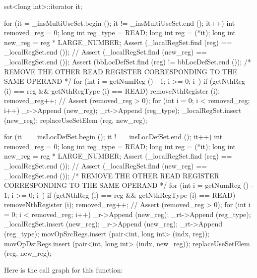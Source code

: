 \begin{DoxyCode}
                                                                                 
                                                                         {
    set<long int>::iterator it;

    for (it = _insMultiUseSet.begin (); it != _insMultiUseSet.end (); it++) {
        int removed_reg = 0;
        long int reg_type = READ;
        long int reg = (*it);
        long int new_reg = reg * LARGE_NUMBER;
        Assert (_localRegSet.find (reg) == _localRegSet.end ());
//        Assert (_localRegSet.find (new_reg) == _localRegSet.end ());
        Assert (bbLocDefSet.find (reg) != bbLocDefSet.end ());
        /* REMOVE THE OTHER READ REGISTER CORRESPONDING TO THE SAME OPERAND */
        for (int i = getNumReg () - 1; i >= 0; i--) {
            if (getNthReg (i) == reg && getNthRegType (i) == READ) {
                removeNthRegister (i);
                removed_reg++;
            }
        }
//        Assert (removed_reg > 0);
        for (int i = 0; i < removed_reg; i++) {
            _r->Append (new_reg);
            _rt->Append (reg_type);
        }
        _localRegSet.insert (new_reg);
        replaceUseSetElem (reg, new_reg);
    }

    for (it = _insLocDefSet.begin (); it != _insLocDefSet.end (); it++) {
        int removed_reg = 0;
        long int reg_type = READ;
        long int reg = (*it);
        long int new_reg = reg * LARGE_NUMBER;
        Assert (_localRegSet.find (reg) == _localRegSet.end ());
//        Assert (_localRegSet.find (new_reg) == _localRegSet.end ());
        /* REMOVE THE OTHER READ REGISTER CORRESPONDING TO THE SAME OPERAND */
        for (int i = getNumReg () - 1; i >= 0; i--) {
            if (getNthReg (i) == reg && getNthRegType (i) == READ) {
                removeNthRegister (i);
                removed_reg++;
            }
        }
//        Assert (removed_reg > 0);
        for (int i = 0; i < removed_reg; i++) {
            _r->Append (new_reg);
            _rt->Append (reg_type);
        }
        _localRegSet.insert (new_reg);
        _r->Append (new_reg);
        _rt->Append (reg_type);
        movOpSrcRegs.insert (pair<int, long int> (indx, reg));
        movOpDstRegs.insert (pair<int, long int> (indx, new_reg));
        replaceUseSetElem (reg, new_reg);
    }
}
\end{DoxyCode}


Here is the call graph for this function:




